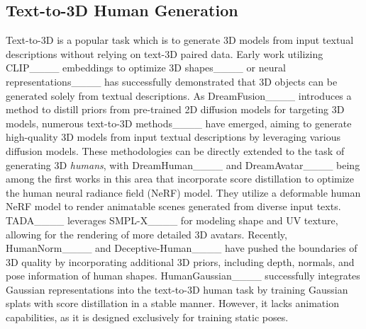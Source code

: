\subsection{Text-to-3D Human Generation}

Text-to-3D is a popular task which is to generate 3D models from input textual descriptions without relying on text-3D paired data.
Early work utilizing CLIP____ embeddings to optimize 3D shapes____ or neural representations____ has successfully demonstrated that 3D objects can be generated solely from textual descriptions.
As DreamFusion____ introduces a method to distill priors from pre-trained 2D diffusion models for targeting 3D models, numerous text-to-3D methods____ have emerged, aiming to generate high-quality 3D models from input textual descriptions by leveraging various diffusion models.
These methodologies can be directly extended to the task of generating 3D {\it humans}, with DreamHuman____ and DreamAvatar____ being among the first works in this area that incorporate score distillation to optimize the human neural radiance field (NeRF) model. 
They utilize a deformable human NeRF model to render animatable scenes generated from diverse input texts.
TADA____ leverages SMPL-X____ for modeling shape and UV texture, allowing for the rendering of more detailed 3D avatars. 
Recently, HumanNorm____ and Deceptive-Human____ have pushed the boundaries of 3D quality by incorporating additional 3D priors, including depth, normals, and pose information of human shapes.
HumanGaussian____ successfully integrates Gaussian representations into the text-to-3D human task by training Gaussian splats with score distillation in a stable manner. However, it lacks animation capabilities, as it is designed exclusively for training static poses.